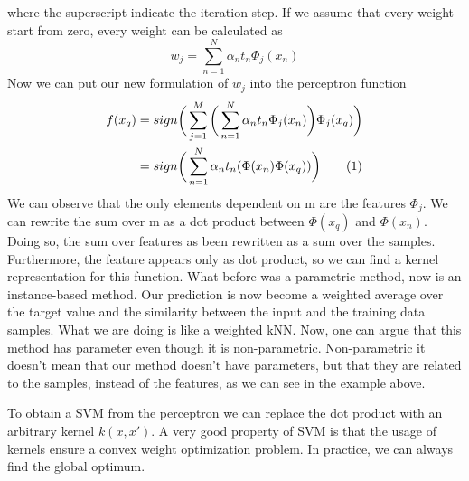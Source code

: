 \documentclass[main.tex]{subfiles}
\newcommand\numberthis{\addtocounter{equation}{1}\tag{\theequation}}
\begin{document}
where the superscript indicate the iteration step. If we assume that every weight start from zero, every weight can be calculated as
\begin{equation*}
    w_j = \sum_{n=1}^N \alpha_n t_n \Phi_j(x_n)
\end{equation*}
Now we can put our new formulation of $w_j$ into the perceptron function
\begin{align*}
    f(x_q) &= sign \bigg( \sum_{j=1}^M \bigg( \sum_{n=1}^N \alpha_n t_n \Phi_j(x_n) \bigg) \Phi_j(x_q) \bigg) \\
    &= sign \bigg( \sum_{n=1}^N \alpha_n t_n (\Phi(x_n) \Phi(x_q)) \bigg) \numberthis
\end{align*}
We can observe that the only elements dependent on m are the features $\Phi_j$. We can rewrite the sum over m as a dot product between $\Phi(x_q)$ and $\Phi(x_n)$. Doing so, the sum over features as been rewritten as a sum over the samples. Furthermore, the feature appears only as dot product, so we can find a kernel representation for this function. What before was a parametric method, now is an instance-based method. Our prediction is now become a weighted average over the target value and the similarity between the input and the training data samples. What we are doing is like a weighted kNN.
Now, one can argue that this method has parameter even though it is non-parametric. Non-parametric it doesn't mean that our method doesn't have parameters, but that they are related to the samples, instead of the features, as we can see in the example above.

To obtain a SVM from the perceptron we can replace the dot product with an arbitrary kernel $k(x,x')$. A very good property of SVM is that the usage of kernels ensure a convex weight optimization problem. In practice, we can always find the global optimum.
\end{document}
